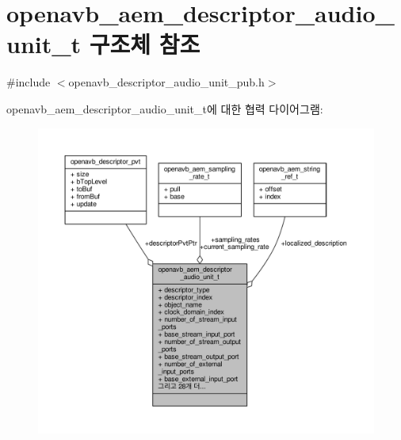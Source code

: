 \hypertarget{structopenavb__aem__descriptor__audio__unit__t}{}\section{openavb\+\_\+aem\+\_\+descriptor\+\_\+audio\+\_\+unit\+\_\+t 구조체 참조}
\label{structopenavb__aem__descriptor__audio__unit__t}


{\ttfamily \#include $<$openavb\+\_\+descriptor\+\_\+audio\+\_\+unit\+\_\+pub.\+h$>$}



openavb\+\_\+aem\+\_\+descriptor\+\_\+audio\+\_\+unit\+\_\+t에 대한 협력 다이어그램\+:
\nopagebreak
\begin{figure}[H]
\begin{center}
\leavevmode
\includegraphics[width=350pt]{structopenavb__aem__descriptor__audio__unit__t__coll__graph}
\end{center}
\end{figure}
